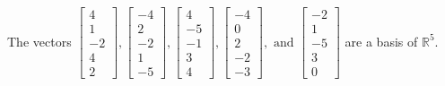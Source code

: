 \begin{exercise}
\begin{exerciseStatement}
  \end{exerciseStatement}
  \begin{exerciseAnswer}
   The vectors \(\left[\begin{array}{r}
4 \\
1 \\
-2 \\
4 \\
2
\end{array}\right] , \left[\begin{array}{r}
-4 \\
2 \\
-2 \\
1 \\
-5
\end{array}\right] , \left[\begin{array}{r}
4 \\
-5 \\
-1 \\
3 \\
4
\end{array}\right] , \left[\begin{array}{r}
-4 \\
0 \\
2 \\
-2 \\
-3
\end{array}\right] , \text{ and } \left[\begin{array}{r}
-2 \\
1 \\
-5 \\
3 \\
0
\end{array}\right]\) 
  	 are  a basis of \(\mathbb{R}^5\).
  


  \end{exerciseAnswer}
\end{exercise}
